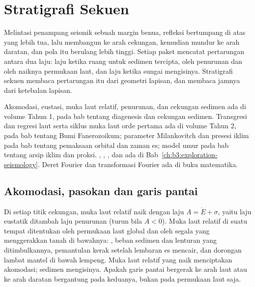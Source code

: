\chapter{Stratigrafi Sekuen}\label{ch:b3:sequence-stratigraphy}

Melintasi penampang seismik sebuah margin benua, refleksi bertumpang di atas
yang lebih tua, lalu membangun ke arah cekungan, kemudian mundur ke arah daratan, dan
pola itu berulang lebih tinggi. Setiap paket mencatat pertarungan antara
dua laju: laju ketika ruang untuk sedimen tercipta, oleh penurunan dan oleh
naiknya permukaan laut, dan laju ketika sungai mengisinya. Stratigrafi sekuen
membaca pertarungan itu dari geometri lapisan, dan  membaca
jamnya dari ketebalan lapisan.

\begin{recall}
Akomodasi, eustasi, muka laut relatif, penurunan, dan cekungan sedimen
ada di volume Tahun 1, pada bab tentang diagenesis dan cekungan sedimen.
Transgresi dan regresi laut serta siklus muka laut orde pertama ada di
volume Tahun 2, pada bab tentang Bumi Fanerozoikum; parameter
Milankovitch dan presesi iklim pada bab tentang pemaksaan orbital dan
zaman es; model umur pada bab tentang arsip iklim
dan proksi. , , ,  dan
 ada di Bab~\ref{ch:b3:exploration-seismology}. Deret Fourier
dan transformasi Fourier ada di buku matematika.
\end{recall}

\section{Akomodasi, pasokan dan garis pantai}\label{sec:b3:sequence-stratigraphy:shoreline}

Di setiap titik cekungan, muka laut relatif naik dengan laju $A = \dot E
+ \sigma$, yaitu laju eustatik ditambah laju penurunan (turun bila $A < 0$).
Muka laut relatif di suatu tempat ditentukan oleh permukaan laut global dan oleh
segala yang menggerakkan tanah di bawahnya: , beban
sedimen dan lenturan yang ditimbulkannya, pemantulan kerak setelah lembaran
es mencair, dan dorongan lambat mantel di bawah lempeng. Muka laut relatif yang naik
menciptakan akomodasi; sedimen mengisinya. Apakah garis pantai
bergerak ke arah laut atau ke arah daratan bergantung pada keduanya, bukan
pada permukaan laut saja.


